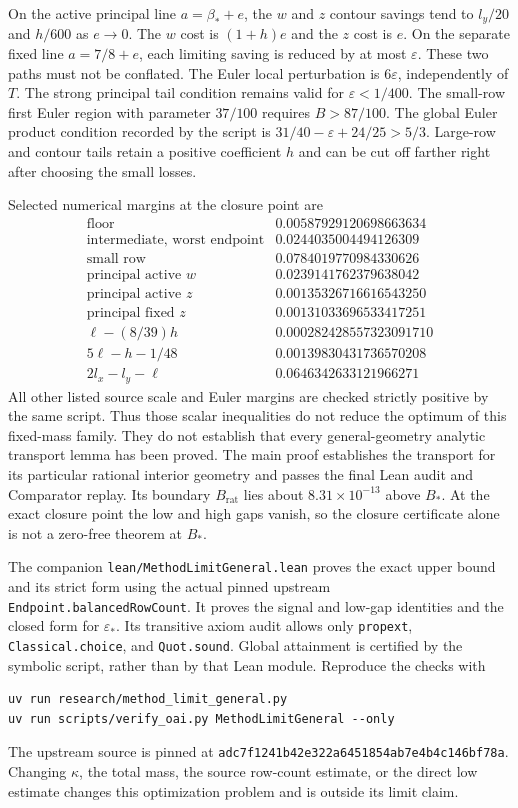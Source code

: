 \documentclass[11pt]{article}
\newcommand{\eps}{\varepsilon}
\begin{document}
On the active principal line $a=\beta_*+e$, the $w$ and $z$ contour
savings tend to $l_y/20$ and $h/600$ as $e\to0$. The $w$ cost is
$(1+h)e$ and the $z$ cost is $e$. On the separate fixed line
$a=7/8+e$, each limiting saving is reduced by at most $\eps$.
These two paths must not be conflated.
The Euler local perturbation is $6\eps$, independently of $T$.
The strong principal tail condition remains valid for $\eps<1/400$.
The small-row first Euler region with parameter $37/100$ requires
$B>87/100$. The global Euler product condition recorded by the script
is $31/40-\eps+24/25>5/3$.
Large-row and contour tails retain a positive coefficient $h$ and
can be cut off farther right after choosing the small losses.

Selected numerical margins at the closure point are
\[
\begin{array}{lr}
 \text{floor} &0.00587929120698663634\\
 \text{intermediate, worst endpoint} &0.0244035004494126309\\
 \text{small row} &0.0784019770984330626\\
 \text{principal active }w &0.0239141762379638042\\
 \text{principal active }z &0.00135326716616543250\\
 \text{principal fixed }z &0.00131033696533417251\\
 \ell-(8/39)h &0.000282428557323091710\\
 5\ell-h-1/48 &0.00139830431736570208\\
 2l_x-l_y-\ell &0.0646342633121966271
\end{array}
\]
All other listed source scale and Euler margins are checked strictly
positive by the same script. Thus those scalar inequalities do not
reduce the optimum of this fixed-mass family. They do not establish
that every general-geometry analytic transport lemma has been proved.
The main proof establishes the transport for its particular rational
interior geometry and passes the final Lean audit and Comparator replay.
Its boundary $B_{\mathrm{rat}}$ lies about $8.31\times10^{-13}$ above
$B_*$. At the exact closure point the low and high gaps vanish, so the
closure certificate alone is not a zero-free theorem at $B_*$.

The companion \texttt{lean/MethodLimitGeneral.lean} proves the exact
upper bound and its strict form using the actual pinned upstream
\texttt{Endpoint.balancedRowCount}. It proves the signal and low-gap
identities and the closed form for $\eps_*$. Its transitive axiom
audit allows only \texttt{propext}, \texttt{Classical.choice}, and
\texttt{Quot.sound}. Global attainment is certified by the symbolic
script, rather than by that Lean module. Reproduce the checks with
\begin{verbatim}
uv run research/method_limit_general.py
uv run scripts/verify_oai.py MethodLimitGeneral --only
\end{verbatim}
The upstream source is pinned at
\texttt{adc7f1241b42e322a6451854ab7e4b4c146bf78a}.
Changing $\kappa$, the total mass, the source row-count estimate, or
the direct low estimate changes this optimization problem and is
outside its limit claim.
\end{document}
